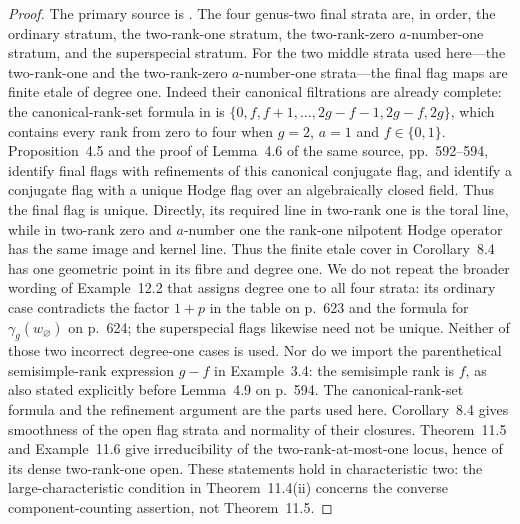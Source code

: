 \begin{proof}
The primary source is
\cite[Corollary~8.4, printed pp.~607--608; Theorem~11.5 and
Example~11.6, p.~620; Example~12.2, pp.~623--624]{EkedahlVanderGeer2009Strata}.
The four genus-two final strata are, in order, the ordinary
stratum, the two-rank-one stratum, the two-rank-zero
$a$-number-one stratum, and the superspecial stratum.
For the two middle strata used here---the two-rank-one and
the two-rank-zero $a$-number-one strata---the final flag
maps are finite etale of degree one. Indeed their canonical
filtrations are already complete: the canonical-rank-set
formula in
\cite[Example~3.4, p.~589]{EkedahlVanderGeer2009Strata}
is $\{0,f,f+1,\ldots,2g-f-1,2g-f,2g\}$, which contains
every rank from zero to four when $g=2$, $a=1$ and
$f\in\{0,1\}$. Proposition~4.5 and the proof of Lemma~4.6
of the same source, pp.~592--594, identify final flags
with refinements of this canonical conjugate flag, and
identify a conjugate flag with a unique Hodge flag over
an algebraically closed field. Thus the final flag is
unique. Directly, its required line in two-rank
one is the toral line, while in two-rank zero and
$a$-number one the rank-one nilpotent Hodge operator has
the same image and kernel line. Thus the finite
etale cover in Corollary~8.4 has one geometric point in its
fibre and degree one. We do not repeat the broader wording
of Example~12.2 that assigns degree one to all four strata:
its ordinary case contradicts the factor $1+p$ in the table
on p.~623 and the formula for $\gamma_g(w_\varnothing)$ on
p.~624; the superspecial flags likewise need not be unique.
Neither of those two incorrect degree-one cases is used.
Nor do we import the parenthetical semisimple-rank
expression $g-f$ in Example~3.4: the semisimple rank is
$f$, as also stated explicitly before Lemma~4.9 on p.~594.
The canonical-rank-set formula and the refinement argument
are the parts used here.
Corollary~8.4 gives smoothness of the open flag strata
and normality of their closures. Theorem~11.5 and
Example~11.6 give irreducibility of the two-rank-at-most-one
locus, hence of its dense two-rank-one open. These statements
hold in characteristic two: the large-characteristic
condition in Theorem~11.4(ii) concerns the converse
component-counting assertion, not Theorem~11.5.


\end{proof}
